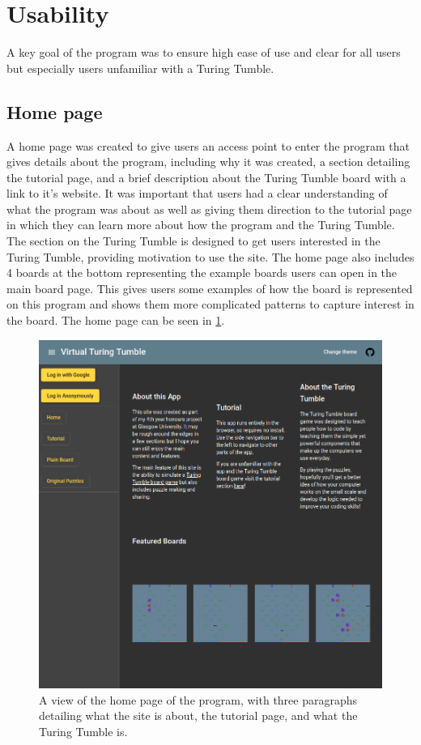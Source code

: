\documentclass{l4proj}
\begin{document}

\section{Usability}
A key goal of the program was to ensure high ease of use and clear for all users but especially users unfamiliar with a Turing Tumble. 

\subsection{Home page}
A home page was created to give users an access point to enter the program that gives details about the program, including why it was created, a section detailing the tutorial page, and a brief description about the Turing Tumble board with a link to it's website. It was important that users had a clear understanding of what the program was about as well as giving them direction to the tutorial page in which they can learn more about how the program and the Turing Tumble. The section on the Turing Tumble is designed to get users interested in the Turing Tumble, providing motivation to use the site. The home page also includes 4 boards at the bottom representing the example boards users can open in the main board page. This gives users some examples of how the board is represented on this program and shows them more complicated patterns to capture interest in the board. The home page can be seen in \ref{fig:homePage}.

\begin{figure}
    \centering
    \includegraphics[width=0.65\linewidth]{images/darkTheme.png}
    \caption{A view of the home page of the program, with three paragraphs detailing what the site is about, the tutorial page, and what the Turing Tumble is.}
    \label{fig:homePage}
\end{figure}
\end{document}
